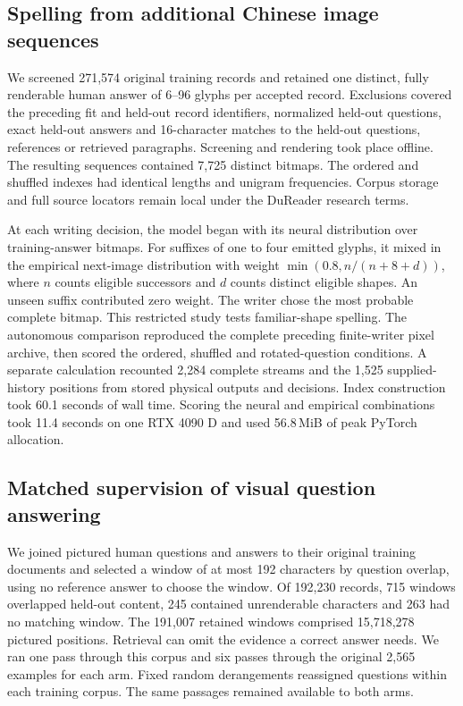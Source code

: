 \documentclass[12pt,a4paper]{article}
\providecommand{\DIFadd}[1]{{\protect\color{blue} \sf #1}} %
\begin{document}
\subsection*{\DIFadd{Spelling from additional Chinese image sequences}}
\DIFadd{We screened 271,574 original training records and retained one distinct, fully renderable human answer of 6--96 glyphs per accepted record. Exclusions covered the preceding fit and held-out record identifiers, normalized held-out questions, exact held-out answers and 16-character matches to the held-out questions, references or retrieved paragraphs. Screening and rendering took place offline. The resulting sequences contained 7,725 distinct bitmaps. The ordered and shuffled indexes had identical lengths and unigram frequencies. Corpus storage and full source locators remain local under the DuReader research terms.
}

\DIFadd{At each writing decision, the model began with its neural distribution over training-answer bitmaps. For suffixes of one to four emitted glyphs, it mixed in the empirical next-image distribution with weight $\min(0.8,n/(n+8+d))$, where $n$ counts eligible successors and $d$ counts distinct eligible shapes. An unseen suffix contributed zero weight. The writer chose the most probable complete bitmap. This restricted study tests familiar-shape spelling. The autonomous comparison reproduced the complete preceding finite-writer pixel archive, then scored the ordered, shuffled and rotated-question conditions. A separate calculation recounted 2,284 complete streams and the 1,525 supplied-history positions from stored physical outputs and decisions. Index construction took 60.1 seconds of wall time. Scoring the neural and empirical combinations took 11.4 seconds on one RTX 4090 D and used 56.8\,MiB of peak PyTorch allocation.
}

\subsection*{\DIFadd{Matched supervision of visual question answering}}
\DIFadd{We joined pictured human questions and answers to their original training documents and selected a window of at most 192 characters by question overlap, using no reference answer to choose the window. Of 192,230 records, 715 windows overlapped held-out content, 245 contained unrenderable characters and 263 had no matching window. The 191,007 retained windows comprised 15,718,278 pictured positions. Retrieval can omit the evidence a correct answer needs. We ran one pass through this corpus and six passes through the original 2,565 examples for each arm. Fixed random derangements reassigned questions within each training corpus. The same passages remained available to both arms.
}
\end{document}
